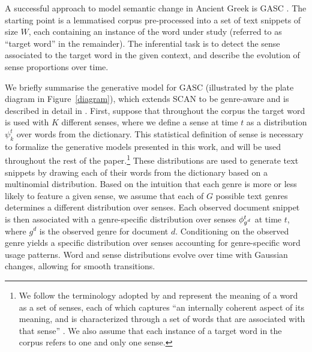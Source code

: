 \documentclass[output=paper]{langscibook}
\begin{document}
A successful approach to model semantic change in Ancient Greek is GASC \citep{perrone-etal-2019-gasc}. The starting point is a lemmatised corpus pre-processed into a set of text snippets of size $W$, each containing an instance of the word under study (referred to as ``target word'' in the remainder). 
The inferential task is to detect the sense associated to the target word in the given context, and describe the evolution of sense proportions over time.


We briefly summarise the generative model for GASC (illustrated by the plate diagram in Figure~\ref{diagram}), which extends SCAN \citep{frermann-lapata-2016-bayesian} to be genre-aware and is described in detail in \citet{perrone-etal-2019-gasc}. First, suppose that throughout the corpus the target word is used with $K$ different senses, where we define a sense at time $t$ as a distribution $\psi^t_k$ over words from the dictionary. This statistical definition of sense is necessary to formalize the generative models presented in this work, and will be used throughout the rest of the paper.\footnote{We follow the terminology adopted by \citet{frermann} and represent the meaning of a word as a set of senses, each of which captures ``an internally coherent aspect of its meaning, and is characterized through a set of words that are associated with that sense'' \citep[173]{frermann}. We also assume that each instance of a target word in the corpus refers to one and only one sense.}
These distributions are used to generate text snippets by drawing each of their words from the dictionary based on a multinomial distribution. Based on the intuition that each genre is more or less likely to feature a given sense, we assume that each of $G$ possible text genres determines a different distribution over senses. Each observed document snippet is then associated with a genre-specific distribution over senses $\phi^t_{\smash{g{^d}}}$ at time $t$, where $g{^d}$ is the observed genre for document $d$. Conditioning on the observed genre yields a specific distribution over senses accounting for genre-specific word usage patterns. 
Word and sense distributions evolve over time with Gaussian changes, allowing for smooth transitions. 
\end{document}
